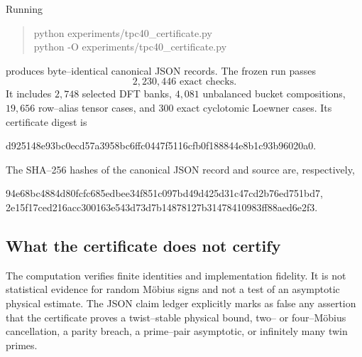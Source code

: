 Running
\begin{quote}
\ttfamily
python experiments/tpc40\_certificate.py\\
python -O experiments/tpc40\_certificate.py
\end{quote}
produces byte--identical canonical JSON records.  The frozen run passes
\begin{equation}
 \boxed{2{,}230{,}446\text{ exact checks}.}
 \label{eq:tpc40-certificate-checks}
\end{equation}
It includes \(2{,}748\) selected DFT banks, \(4{,}081\) unbalanced bucket
compositions, \(19{,}656\) row--alias tensor cases, and \(300\) exact
cyclotomic Loewner cases.  Its certificate digest is
\begin{center}
\ttfamily\small
d925148e93bc0ecd57a3958bc6ffc0447f5116cfb0f188844e8b1c93b96020a0.
\end{center}
The SHA--256 hashes of the canonical JSON record and source are,
respectively,
\begin{center}
\ttfamily\small
94e68bc4884d80fcfc685edbee34f851c097bd49d425d31c47cd2b76ed751bd7,\\
2e15f17ced216acc300163e543d73d7b14878127b31478410983ff88aed6e2f3.
\end{center}

\subsection{What the certificate does not certify}

The computation verifies finite identities and implementation fidelity.
It is not statistical evidence for random M\"obius signs and not a test of
an asymptotic physical estimate.  The JSON claim ledger explicitly marks
as false any assertion that the certificate proves a twist--stable
physical bound, two-- or four--M\"obius cancellation, a parity breach, a
prime--pair asymptotic, or infinitely many twin primes.
